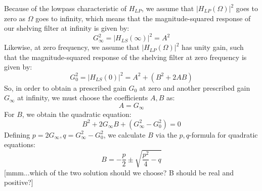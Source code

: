 Because of the lowpass characteristic of $H_{LP}$, we assume that $|H_{LP}(\Omega)|^2$ goes to zero as $\Omega$ goes to infinity, which means that the magnitude-squared response of our shelving filter at infinity is given by:
\begin{equation}
 G_{\infty}^2 = |H_{LS}(\infty)|^2 = A^2
\end{equation}
Likewise, at zero frequency, we assume that $|H_{LP}(\Omega)|^2$ has unity gain, such that the magnitude-squared response of the shelving filter at zero frequency is given by:
\begin{equation}
 G_0^2 = |H_{LS}(0)|^2 = A^2 + (B^2 + 2AB)
\end{equation}
So, in order to obtain a prescribed gain $G_0$ at zero and another prescribed gain $G_{\infty}$ at infinity, we must choose the coefficients $A, B$ as:
\begin{equation}
 A = G_{\infty}
\end{equation}
For $B$, we obtain the quadratic equation:
\begin{equation}
 B^2 + 2 G_{\infty} B + (G_{\infty}^2 - G_0^2) = 0
\end{equation}
Defining $p = 2 G_{\infty}, q = G_{\infty}^2 - G_0^2$, we calculate $B$ via the $p,q$-formula for quadratic equations:
\begin{equation}
 B = -\frac{p}{2} \pm \sqrt{\frac{p^2}{4} - q}
\end{equation}
[mmm...which of the two solution should we choose? B should be real and positive?]


